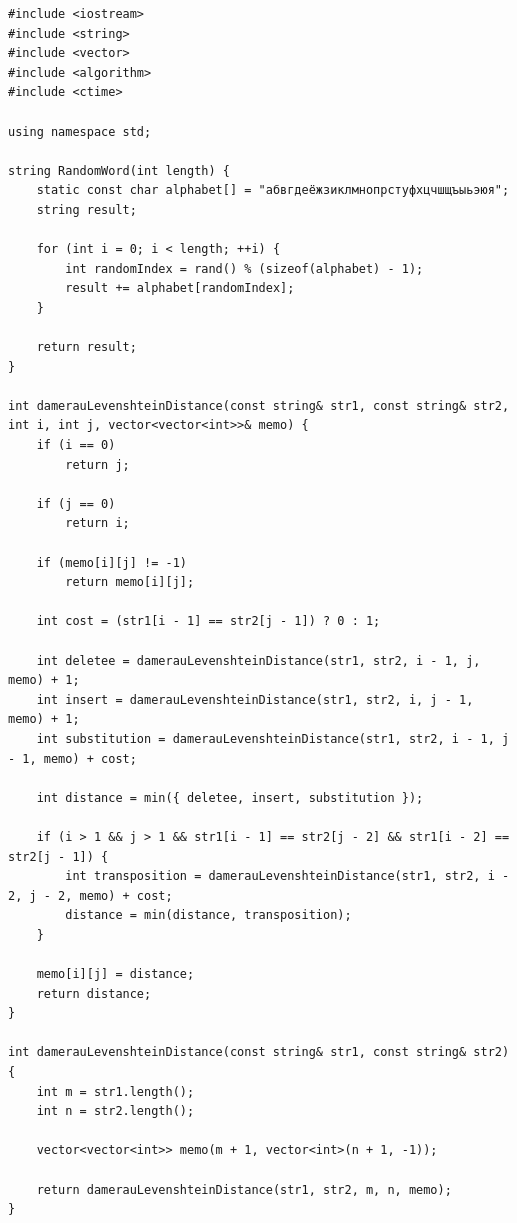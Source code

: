 \documentclass[12pt, a4paper]{article}
\begin{document}
\begin{lstlisting}[caption={Расстояние Дамерау-Левенштейна рекурсивный метод, используя три строки матрицы},label={lst:label3}]
#include <iostream>
#include <string>
#include <vector>
#include <algorithm>
#include <ctime>

using namespace std;

string RandomWord(int length) {
	static const char alphabet[] = "абвгдеёжзиклмнопрстуфхцчшщъыьэюя";
	string result;

	for (int i = 0; i < length; ++i) {
		int randomIndex = rand() % (sizeof(alphabet) - 1);
		result += alphabet[randomIndex];
	}

	return result;
}

int damerauLevenshteinDistance(const string& str1, const string& str2, int i, int j, vector<vector<int>>& memo) {
	if (i == 0)
		return j;

	if (j == 0)
		return i;

	if (memo[i][j] != -1)
		return memo[i][j];

	int cost = (str1[i - 1] == str2[j - 1]) ? 0 : 1;

	int deletee = damerauLevenshteinDistance(str1, str2, i - 1, j, memo) + 1;
	int insert = damerauLevenshteinDistance(str1, str2, i, j - 1, memo) + 1;
	int substitution = damerauLevenshteinDistance(str1, str2, i - 1, j - 1, memo) + cost;

	int distance = min({ deletee, insert, substitution });

	if (i > 1 && j > 1 && str1[i - 1] == str2[j - 2] && str1[i - 2] == str2[j - 1]) {
		int transposition = damerauLevenshteinDistance(str1, str2, i - 2, j - 2, memo) + cost;
		distance = min(distance, transposition);
	}

	memo[i][j] = distance;
	return distance;
}

int damerauLevenshteinDistance(const string& str1, const string& str2) {
	int m = str1.length();
	int n = str2.length();

	vector<vector<int>> memo(m + 1, vector<int>(n + 1, -1));

	return damerauLevenshteinDistance(str1, str2, m, n, memo);
}


\end{lstlisting}
\end{document}

